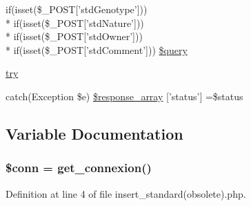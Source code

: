 \begin{DoxyCompactItemize}
if(isset(\$\-\_\-\-P\-O\-S\-T\mbox{[}'std\-Genotype'\mbox{]})) \\*
if(isset(\$\-\_\-\-P\-O\-S\-T\mbox{[}'std\-Nature'\mbox{]})) \\*
if(isset(\$\-\_\-\-P\-O\-S\-T\mbox{[}'std\-Owner'\mbox{]})) \\*
if(isset(\$\-\_\-\-P\-O\-S\-T\mbox{[}'std\-Comment'\mbox{]})) \hyperlink{insert__standard_07obsolete_08_8php_ad275b7c787a22ccb6a1c69a37d26bc0e}{\$query}
\item 
\hyperlink{insert__standard_07obsolete_08_8php_abe4cc9788f52e49485473dc699537388}{try}
\item 
catch(Exception \$e) \hyperlink{insert__standard_07obsolete_08_8php_a8452fb8131316637a04e25f5fde066d9}{\$response\-\_\-array} \mbox{[}'status'\mbox{]} =\$status
\end{DoxyCompactItemize}


\subsection{Variable Documentation}
\hypertarget{insert__standard_07obsolete_08_8php_aa8a5a87b9c1a6a0819b88447cbe41877}{
\subsubsection[{\$conn}]{\setlength{\rightskip}{0pt plus 5cm}\$conn = {\bf get\-\_\-connexion}()}}\label{insert__standard_07obsolete_08_8php_aa8a5a87b9c1a6a0819b88447cbe41877}


Definition at line 4 of file insert\-\_\-standard(obsolete).\-php.

